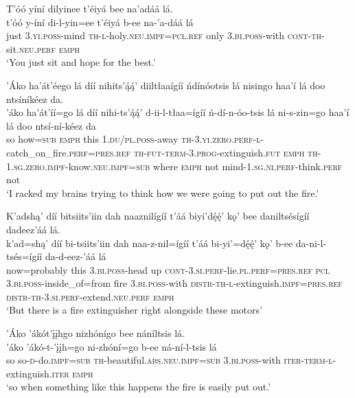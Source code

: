 \ea\label{ex:text9-9-18}
T’óó yíní dilyinee t’éiyá bee na’adáá lá.\\
\gll t’óó	y-íní	di-l-yin=ee	t’éiyá	b-ee	na-’a-dáá	lá\\
     just	3.\textsc{yi}.\textsc{poss}-mind	\textsc{th}-\textsc{l}-holy.\textsc{neu}.\textsc{impf}=\textsc{pcl}.\textsc{ref}	only	3.\textsc{bi}.\textsc{poss}-with	\textsc{cont}-\textsc{th}-sit.\textsc{neu}.\textsc{perf}	\textsc{emph}\\
\glt `You just sit and hope for the best.'
\z

\ea\label{ex:text9-9-19}
’Áko ha’át’éego lá díí nihits’ą́ą́’ diiltłaaígíí ńdínóotsis lá nisingo haa’í lá doo ntsíníkéez da.\\
\gll ’áko	ha’át’íí=go	lá	díí	nihi-ts’ą́ą́’	d-ii-l-tłaa=ígíí	ń-dí-n-óo-tsis	lá	ni-s-zin=go	haa’í	lá	doo	ntsí-ní-kéez	da\\
     so	how=\textsc{sub}	\textsc{emph}	this	1.\textsc{du}/\textsc{pl}.\textsc{poss}-away	\textsc{th}-3.\textsc{yi}.\textsc{zero}.\textsc{perf}-\textsc{l}-catch\_on\_fire.\textsc{perf}=\textsc{pres}.\textsc{ref}	\textsc{th}-\textsc{fut}-\textsc{term}-3.\textsc{prog}-extinguish.\textsc{fut}	\textsc{emph}	\textsc{th}-1.\textsc{sg}.\textsc{zero}.\textsc{impf}-know.\textsc{neu}.\textsc{impf}=\textsc{sub}	where	\textsc{emph}	not	mind-1.\textsc{sg}.\textsc{ni}.\textsc{perf}-think.\textsc{perf}	not\\
\glt `I racked my brains trying to think how we were going to put out the fire.'
\z

\ea\label{ex:text9-9-20}
K’adshą’ díí bitsiits’iin dah naaznilígíí t’áá biyi’dę́ę́’ kǫ’ bee daniltsésígíí dadeez’áá lá.\\
\gll k’ad=shą’	díí	bi-tsiits’iin	dah	naa-z-nil=ígíí	t’áá	bi-yi’=dę́ę́’	kǫ’ b-ee da-ni-l-tsés=ígíí	da-d-eez-’áá	lá\\
     now=probably	this	3.\textsc{bi}.\textsc{poss}-head	up	\textsc{cont}-3.\textsc{si}.\textsc{perf}-lie.\textsc{pl}.\textsc{perf}=\textsc{pres}.\textsc{ref}	\textsc{pcl}	3.\textsc{bi}.\textsc{poss}-inside\_of=from	fire 3.\textsc{bi}.\textsc{poss}-with \textsc{distr}-\textsc{th}-\textsc{l}-extinguish.\textsc{impf}=\textsc{pres}.\textsc{ref}	\textsc{distr}-\textsc{th}-3.\textsc{si}.\textsc{perf}-extend.\textsc{neu}.\textsc{perf}	\textsc{emph}\\
\glt `But there is a fire extinguisher right alongside these motors'
\z

\ea\label{ex:text9-9-21}
’Áko ’ákót’įįhgo nizhónígo bee náníltsis lá.\\
\gll ’áko	’ákó-t-’įįh=go	ni-zhóní=go	b-ee	ná-ní-l-tsis	lá\\
     so	so-\textsc{d}-do.\textsc{impf}=\textsc{sub}	\textsc{th}-beautiful.\textsc{abs}.\textsc{neu}.\textsc{impf}=\textsc{sub}	3.\textsc{bi}.\textsc{poss}-with	\textsc{iter}-\textsc{term}-\textsc{l}-extinguish.\textsc{iter}	\textsc{emph}\\
\glt `so when something like this happens the fire is easily put out.'
\z

